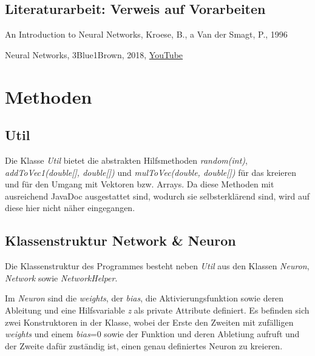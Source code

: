 \documentclass[paper=A4,pagesize=auto,12pt,headinclude=true,footinclude=true,BCOR=0mm,DIV=calc]{scrartcl}
\begin{document}
\subsection{Literaturarbeit: Verweis auf Vorarbeiten}
\begin{itemize}
	\item{An Introduction to Neural Networks, Kroese, B., a Van der Smagt, P., 1996}
	\hypertarget{3b1b}{\item{Neural Networks, 3Blue1Brown, 2018, \hyperref{https://www.youtube.com/playlist?list=PLZHQObOWTQDNU6R1_67000Dx_ZCJB-3pi}{}{}{YouTube}}}
\end{itemize}


\newpage


\section{Methoden} %

\subsection{Util} %
Die Klasse \textit{Util} bietet die abstrakten Hilfsmethoden \textit{random(int)}, \textit{addToVec1(double[], double[])} und \textit{mulToVec(double, double[])} für das kreieren und für den Umgang mit Vektoren bzw. Arrays. Da diese Methoden mit ausreichend JavaDoc ausgestattet sind, wodurch sie selbsterklärend sind, wird auf diese hier nicht näher eingegangen.


\subsection{Klassenstruktur Network \& Neuron} %
Die Klassenstruktur des Programmes besteht neben \textit{Util} aus den Klassen \textit{Neuron}, \textit{Network} sowie \textit{NetworkHelper}.

Im \textit{Neuron} sind die \textit{weights}, der \textit{bias}, die Aktivierungsfunktion sowie deren Ableitung und eine Hilfsvariable \textit{z} als private Attribute definiert.
Es befinden sich zwei Konstruktoren in der Klasse, wobei der Erste den Zweiten mit zufälligen \textit{weights} und einem \textit{bias}=0 sowie der Funktion und deren Abletiung aufruft und der Zweite dafür zuständig ist, einen genau definiertes Neuron zu kreieren.
\end{document}

